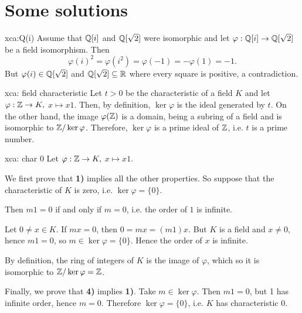 \section*{Some solutions}





\begin{sol}{xca:Q(i)}
Assume that $\mathbb{Q}[i]$ and $\mathbb{Q}[\sqrt{2}]$ were isomorphic 
and let $\varphi:\mathbb{Q}[i]\to \mathbb{Q}[\sqrt{2}]$
be a field isomorphism.
Then 
    \[
    \varphi(i)^2=
    \varphi(i^2)=
    \varphi(-1)=
    -\varphi(1)=-1.
    \]
But $\varphi(i)\in\mathbb{Q}[\sqrt{2}]$ and
$\mathbb{Q}[\sqrt{2}]\subseteq \mathbb{R}$ where every square is 
positive, a contradiction.
\end{sol}

\begin{sol}{xca: field characteristic}
    Let $t>0$ be the characteristic of a field $K$ and 
    let $\varphi:\mathbb{Z}\to K,$ $x\mapsto x1$.
    Then, by definition, $\ker\varphi$ is 
    the ideal generated by $t$.
    On the other hand, the image $\varphi(\mathbb{Z})$ is 
    a domain, being a subring of a field
    and is isomorphic to $\mathbb{Z}/\ker\varphi$.
    Therefore, $\ker\varphi$ is a prime ideal of $\mathbb{Z}$,
    i.e. $t$ is a prime number.
\end{sol}

\begin{sol}{xca: char 0}
Let $\varphi:\mathbb{Z}\to K,$ $x\mapsto x1$.

We first prove that \textbf{1)} implies all the other 
properties. So suppose that the characteristic of $K$ is zero, i.e. $\ker\varphi=\{0\}$. 

Then $m1=0$ if and only if $m=0$, i.e.
the order of $1$ is infinite.

Let $0\neq x\in K$. If $mx=0$, then $0=mx=(m1)x$.
But $K$ is a field and $x\neq 0$, hence $m1=0$,
so $m\in\ker\varphi=\{0\}$.
Hence the order of $x$ is infinite.

By definition, the ring of integers of $K$ is
the image of $\varphi$, which 
so it is isomorphic to $\mathbb{Z}/\ker\varphi=\mathbb{Z}$.

Finally, we prove that \textbf{4)} implies \textbf{1)}.
Take $m\in\ker\varphi$. Then $m1=0$,
but 1 has infinite order, hence $m=0$.
Therefore $\ker\varphi=\{0\}$, 
i.e. $K$ has characteristic 0.
\end{sol}

